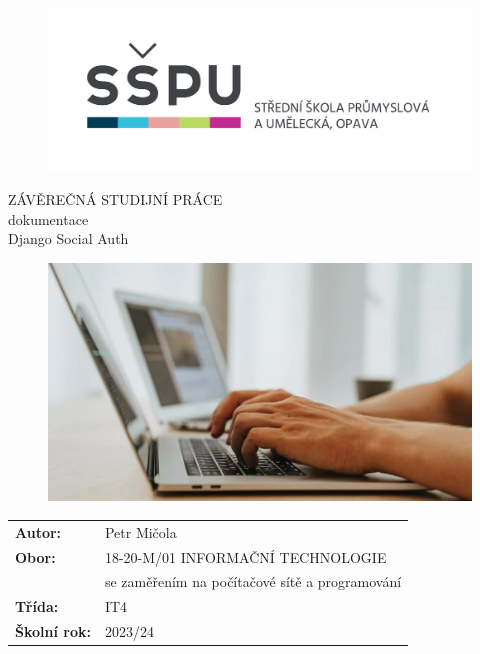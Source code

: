 \documentclass[12pt, a4paper,
twoside,        %
openright
]{report}
\title{\nazevPrace} %
\author{\jmenoAutora} %
\date{\datumOdevzdani} %
\newcommand\obor{INFORMAČNÍ TECHNOLOGIE} %
\newcommand\kodOboru{18-20-M/01} %
\newcommand\zamereni{se zaměřením na počítačové sítě a programování} %
\newcommand\trida{IT4} %
\newcommand\jmenoAutora{Petr Mičola}  %
\newcommand\skolniRok{2023/24} %
\newcommand\nazevPrace{Django Social Auth} %
\begin{document}
	
	\pagestyle{empty}
	
	\cleardoublepage

	
	{\selectfont
		\begin{figure}[h]
			\centering
			\includegraphics[width=0.6\linewidth]{image/logo-skoly.png} 
		\end{figure}
		
		
		{\bfseries %
			\begin{center}
				\vspace{0.025 \textheight}
				\LARGE{ZÁVĚREČNÁ STUDIJNÍ PRÁCE}\\
				\large{dokumentace}\\
				\vspace{0.075 \textheight}
				\LARGE {\nazevPrace}\\
			\end{center}  
		}%
		
		\begin{figure}[h]
			\centering
			\includegraphics[width=0.8\linewidth]{image/programovani-02.jpg} 
		\end{figure}
		
		\vspace{0.02 \textheight}
		\begin{table}[h!]
			\begin{tabular}{ll}
				\textbf{Autor:} & \jmenoAutora\\ 
				\textbf{Obor:} & \kodOboru { } \obor\\
				\textbf{} & \zamereni\\
				\textbf{Třída:} & \trida\\
				\textbf{Školní rok:} & \skolniRok\\
			\end{tabular}
			
		\end{table}		
	}
	
\end{document}
